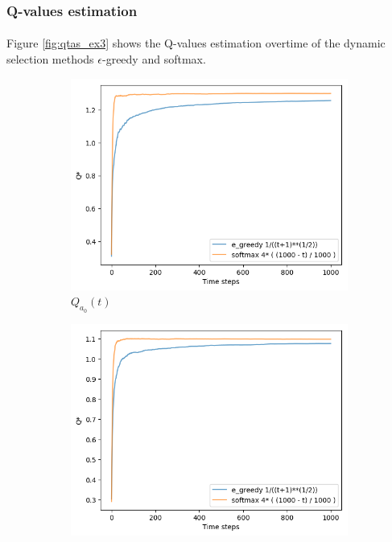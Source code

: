 \documentclass[letterpaper]{article}
\begin{document}
\subsubsection{Q-values estimation}

\paragraph{}

Figure \ref{fig:qtas_ex3} shows the Q-values estimation overtime of
the dynamic selection methods $\epsilon$-greedy and softmax.

\begin{figure}[H]
  \begin{subfigure}{.5\textwidth}
    \centering
    \includegraphics[width=1\linewidth]{images/assign3/ex3/qta_0}
    \caption{$Q_{a_{0}}(t)$}
    \label{fig:qta_0_ex3}
  \end{subfigure}
  \begin{subfigure}{.5\textwidth}
    \centering
    \includegraphics[width=1\linewidth]{images/assign3/ex3/qta_1}

\end{subfigure}
\end{figure}
\end{document}
